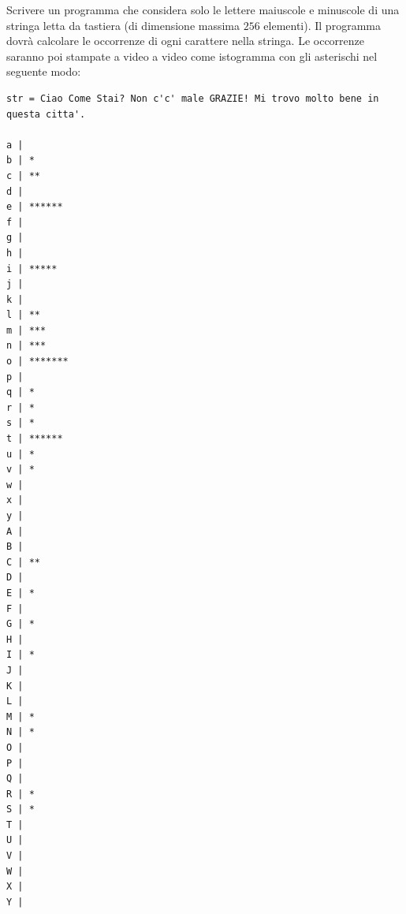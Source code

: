 \begin{Exercise}[label={ex:istogramma}]
  Scrivere un programma che considera solo le lettere maiuscole e minuscole di una stringa letta da tastiera (di dimensione massima $256$ elementi). Il programma dovr\`a calcolare le occorrenze di ogni carattere nella stringa. Le occorrenze saranno poi stampate a video a video come istogramma con gli asterischi nel seguente modo:

\begin{lstlisting}[style=console]
str = Ciao Come Stai? Non c'c' male GRAZIE! Mi trovo molto bene in questa citta'.

a |
b | *
c | **
d |
e | ******
f |
g |
h |
i | *****
j |
k |
l | **
m | ***
n | ***
o | *******
p |
q | *
r | *
s | *
t | ******
u | *
v | *
w |
x |
y |
A |
B |
C | **
D |
E | *
F |
G | *
H |
I | *
J |
K |
L |
M | *
N | *
O |
P |
Q |
R | *
S | *
T |
U |
V |
W |
X |
Y |
\end{lstlisting}
\end{Exercise}

\begin{Answer}[ref={ex:istogramma}]
  
\end{Answer}